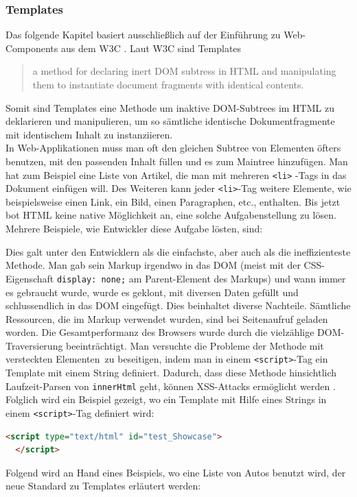 \subsubsection{Templates}
\label{sec:3_WC_Templates}
Das folgende Kapitel basiert ausschließlich auf der Einführung zu Web-Components aus dem W3C \citereset \autocite{Glakov.2013}.
Laut W3C sind Templates
\begin{quote}
\glqq
  a method for declaring inert DOM subtress in HTML and manipulating them to instantiate document fragments with identical contents.
\grqq
\end{quote}
Somit sind Templates eine Methode um inaktive DOM-Subtrees im HTML zu deklarieren und manipulieren, um so sämtliche identische Dokumentfragmente mit identischem Inhalt zu instanziieren.\\
In Web-Applikationen muss man oft den gleichen Subtree von Elementen öfters benutzen, mit den passenden Inhalt füllen und es zum Maintree hinzufügen. Man hat zum Beispiel eine Liste von Artikel, die man mit mehreren \lstinline|<li>| -Tags in das Dokument einfügen will. Des Weiteren kann jeder \lstinline|<li>|-Tag weitere Elemente, wie beispielsweise einen Link, ein Bild, einen Paragraphen, etc., enthalten. Bis jetzt bot HTML keine native Möglichkeit an, eine solche Aufgabenstellung zu lösen. Mehrere Beispiele, wie Entwickler diese Aufgabe lösten, sind:
\begin{enumerate}
Dies galt unter den Entwicklern als die einfachste, aber auch als die ineffizienteste Methode. Man gab sein Markup irgendwo in das DOM (meist mit der CSS-Eigenschaft \lstinline|display: none;| am Parent-Element des Markups) und wann immer es gebraucht wurde, wurde es geklont, mit diversen Daten gefüllt und schlussendlich in das DOM eingefügt. Dies beinhaltet diverse Nachteile. Sämtliche Ressourcen, die im Markup verwendet wurden, sind bei Seitenaufruf geladen worden. Die Gesamtperformanz des Browsers wurde durch die vielzählige DOM-Traversierung beeinträchtigt.
Man versuchte die Probleme der Methode mit \glqq versteckten Elementen\grqq\ zu beseitigen, indem man in einem \lstinline|<script>|-Tag ein Template mit einem String definiert. Dadurch, dass diese Methode hinsichtlich Laufzeit-Parsen von \lstinline|innerHtml| geht, können XSS-Attacks ermöglicht werden . Folglich wird ein Beispiel gezeigt, wo ein Template mit Hilfe eines Strings in einem \lstinline|<script>|-Tag definiert wird:
\begin{lstlisting}[language=HTML, caption=String-Template]
  <script type="text/html" id="test_Showcase">
  </script>
\end{lstlisting}
\end{enumerate}
Folgend wird an Hand eines Beispiels, wo eine Liste von Autos benutzt wird, der neue Standard zu Templates erläutert werden:\\

